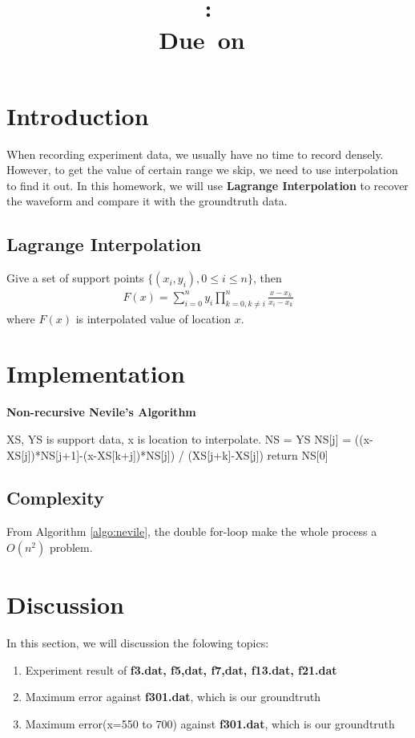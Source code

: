 \documentclass{article}
\title{
    \vspace{2in}
    \textmd{\textbf{\hmwkClass}}\\
    \textmd{\textbf{\hmwkID: \hmwkTitle}} \\
    \normalsize\vspace{0.1in}\small{Due\ on\ \hmwkDueDate}\\
    \vspace{3in}
}
\author{\textbf{\hmwkAuthorName}}
\date{} %
\begin{document}
\maketitle
\newpage

\section{Introduction}
When recording experiment data, we usually have no time to record densely. However, to get the value of certain
range we skip, we need to use interpolation to find it out. In this homework, we will use \textbf{Lagrange Interpolation} to
recover the waveform and compare it with the groundtruth data.
\subsection{Lagrange Interpolation}
Give a set of support points $\{(x_i, y_i), 0 \leq i \leq n\}$, then
\begin{align}
    F(x) = \sum_{i=0}^{n}y_i\prod_{k=0,k \neq i}^{n}\frac{x-x_k}{x_i-x_k}
\end{align}
where $F(x)$ is interpolated value of location $x$.

\section{Implementation}
\begin{algorithm}[H]
    \caption{\textbf{Non-recursive Nevile's Algorithm}}
    \label{algo:nevile}
    \begin{algorithmic}
        \State XS, YS is support data, x is location to interpolate.
        \State NS = YS
                \State NS[j] = ((x-XS[j])*NS[j+1]-(x-XS[k+j])*NS[j]) / (XS[j+k]-XS[j])
            \EndFor
        \EndFor
        \State return NS[0]
    \end{algorithmic}
\end{algorithm}

\subsection{Complexity}
\label{sec:complexity}
From Algorithm \ref{algo:nevile}, the double for-loop make the whole process a {\boldmath$O(n^2)$} problem.

\section{Discussion}
In this section, we will discussion the folowing topics:
\begin{enumerate}
    \item Experiment result of \textbf{f3.dat, f5,dat, f7,dat, f13.dat, f21.dat}
    \item Maximum error against \textbf{f301.dat}, which is our groundtruth
    \item Maximum error(x=550 to 700) against \textbf{f301.dat}, which is our groundtruth
\end{enumerate}
\newpage
\end{document}
